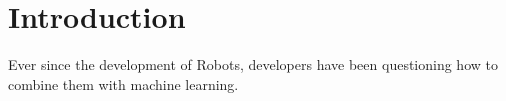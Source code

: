 \chapter{Introduction}
\label{chap:introduction}

Ever since the development of Robots, developers have been questioning how to combine them with machine learning.
